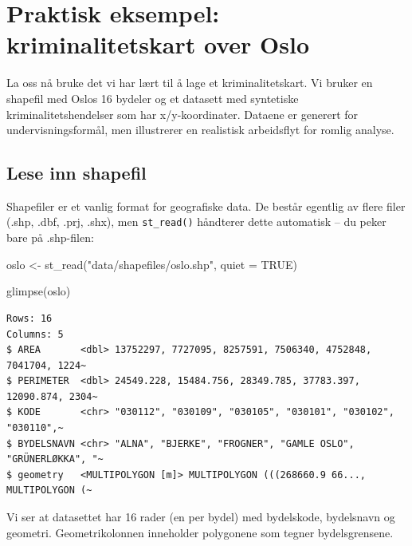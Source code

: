 \documentclass[
  norsk,
  letterpaper,
  DIV=11,
  numbers=noendperiod]{scrreprt}
\newenvironment{Shaded}{\begin{snugshade}}{\end{snugshade}}
\newcommand{\AttributeTok}[1]{\textcolor[rgb]{0.40,0.45,0.13}{#1}}
\newcommand{\ConstantTok}[1]{\textcolor[rgb]{0.56,0.35,0.01}{#1}}
\newcommand{\FunctionTok}[1]{\textcolor[rgb]{0.28,0.35,0.67}{#1}}
\newcommand{\NormalTok}[1]{\textcolor[rgb]{0.00,0.23,0.31}{#1}}
\newcommand{\OtherTok}[1]{\textcolor[rgb]{0.00,0.23,0.31}{#1}}
\newcommand{\StringTok}[1]{\textcolor[rgb]{0.13,0.47,0.30}{#1}}
\theoremstyle{definition}
\theoremstyle{remark}
\begin{document}
\section{Praktisk eksempel: kriminalitetskart over
Oslo}\label{praktisk-eksempel-kriminalitetskart-over-oslo}

La oss nå bruke det vi har lært til å lage et kriminalitetskart. Vi
bruker en shapefil med Oslos 16 bydeler og et datasett med syntetiske
kriminalitetshendelser som har x/y-koordinater. Dataene er generert for
undervisningsformål, men illustrerer en realistisk arbeidsflyt for
romlig analyse.

\subsection{Lese inn shapefil}\label{lese-inn-shapefil}

Shapefiler er et vanlig format for geografiske data. De består egentlig
av flere filer (.shp, .dbf, .prj, .shx), men \texttt{st\_read()}
håndterer dette automatisk -- du peker bare på .shp-filen:

\begin{Shaded}
\begin{Highlighting}[]
\NormalTok{oslo }\OtherTok{\textless{}{-}} \FunctionTok{st\_read}\NormalTok{(}\StringTok{"data/shapefiles/oslo.shp"}\NormalTok{, }\AttributeTok{quiet =} \ConstantTok{TRUE}\NormalTok{)}
\end{Highlighting}
\end{Shaded}

\begin{Shaded}
\begin{Highlighting}[]
\FunctionTok{glimpse}\NormalTok{(oslo)}
\end{Highlighting}
\end{Shaded}

\begin{verbatim}
Rows: 16
Columns: 5
$ AREA       <dbl> 13752297, 7727095, 8257591, 7506340, 4752848, 7041704, 1224~
$ PERIMETER  <dbl> 24549.228, 15484.756, 28349.785, 37783.397, 12090.874, 2304~
$ KODE       <chr> "030112", "030109", "030105", "030101", "030102", "030110",~
$ BYDELSNAVN <chr> "ALNA", "BJERKE", "FROGNER", "GAMLE OSLO", "GRÜNERLØKKA", "~
$ geometry   <MULTIPOLYGON [m]> MULTIPOLYGON (((268660.9 66..., MULTIPOLYGON (~
\end{verbatim}

Vi ser at datasettet har 16 rader (en per bydel) med bydelskode,
bydelsnavn og geometri. Geometrikolonnen inneholder polygonene som
tegner bydelsgrensene.
\end{document}
